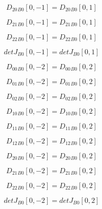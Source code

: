 \documentclass{article}
\begin{document}
\begin{dmath}{D_{20}{_{B0}}}[{0,-1}] = {D_{20}{_{B0}}}[{0,1}]\end{dmath}

\begin{dmath}{D_{21}{_{B0}}}[{0,-1}] = {D_{21}{_{B0}}}[{0,1}]\end{dmath}

\begin{dmath}{D_{22}{_{B0}}}[{0,-1}] = {D_{22}{_{B0}}}[{0,1}]\end{dmath}

\begin{dmath}{detJ{_{B0}}}[{0,-1}] = {detJ{_{B0}}}[{0,1}]\end{dmath}

\begin{dmath}{D_{00}{_{B0}}}[{0,-2}] = {D_{00}{_{B0}}}[{0,2}]\end{dmath}

\begin{dmath}{D_{01}{_{B0}}}[{0,-2}] = {D_{01}{_{B0}}}[{0,2}]\end{dmath}

\begin{dmath}{D_{02}{_{B0}}}[{0,-2}] = {D_{02}{_{B0}}}[{0,2}]\end{dmath}

\begin{dmath}{D_{10}{_{B0}}}[{0,-2}] = {D_{10}{_{B0}}}[{0,2}]\end{dmath}

\begin{dmath}{D_{11}{_{B0}}}[{0,-2}] = {D_{11}{_{B0}}}[{0,2}]\end{dmath}

\begin{dmath}{D_{12}{_{B0}}}[{0,-2}] = {D_{12}{_{B0}}}[{0,2}]\end{dmath}

\begin{dmath}{D_{20}{_{B0}}}[{0,-2}] = {D_{20}{_{B0}}}[{0,2}]\end{dmath}

\begin{dmath}{D_{21}{_{B0}}}[{0,-2}] = {D_{21}{_{B0}}}[{0,2}]\end{dmath}

\begin{dmath}{D_{22}{_{B0}}}[{0,-2}] = {D_{22}{_{B0}}}[{0,2}]\end{dmath}

\begin{dmath}{detJ{_{B0}}}[{0,-2}] = {detJ{_{B0}}}[{0,2}]\end{dmath}
\end{document}
